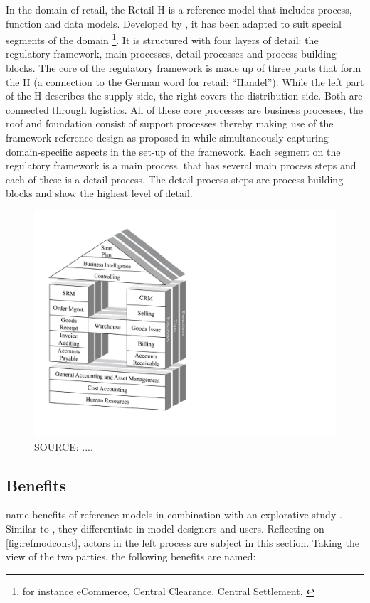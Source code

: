 		In the domain of retail, the Retail-H is a reference model that includes process, function and data models. Developed by \cite{becker2004handelsinformationssysteme}, it has been adapted to suit special segments of the domain \footnote{for instance eCommerce, Central Clearance, Central Settlement. \cf \citep{Puster2015}}. 
		It is structured with four layers of detail: the regulatory framework, main processes, detail processes and process building blocks. The core of the regulatory framework is made up of three parts that form the H (a connection to the German word for retail: \enquote{Handel}). While the left part of the H describes the supply side, the right covers the distribution side. Both are connected through logistics. All of these core processes are business processes, the roof and foundation consist of support processes thereby making use of the framework reference design as proposed in \cite{Meise2001} while simultaneously capturing domain-specific aspects in the set-up of the framework. 
		Each segment on the regulatory framework is a main process, that has several main process steps and each of these is a detail process. The detail process steps are process building blocks and show the highest level of detail. 
		\begin{figure}[caption={Retail-H}, label={fig:retailh}]
			{	\includegraphics[width=.6\textwidth]{figures/retailh.pdf}}
			\hspace{6.2cm}	SOURCE:  ....
		\end{figure}
		


		\subsection{Benefits}
		
		\citeauthor{becker2004handelsinformationssysteme} name benefits of reference models in combination with an explorative study \citep[]{Schutte1998}. Similar to \cite{vom2006reusable}, they differentiate in model designers and users. Reflecting on \Fig \ref{fig:refmodconst}, actors in the left process are subject in this section. Taking the view of the two parties, the following benefits are named:
		
